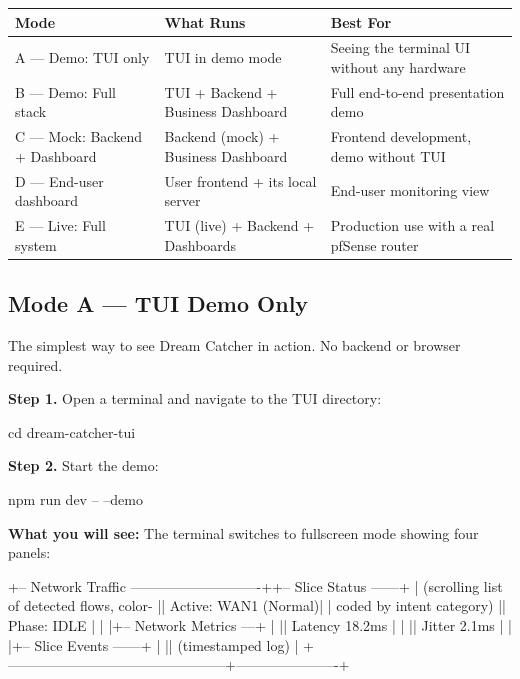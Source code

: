 \documentclass[11pt, a4paper]{article}
\newcommand{\ra}{\rowcolor{tablegray}}
\begin{document}
\vspace{0.3em}
\begin{center}
\renewcommand{\arraystretch}{1.3}
\begin{tabular}{L{3.5cm} L{5cm} L{5.5cm}}
\toprule
{}
\textbf{Mode} & \textbf{What Runs} & \textbf{Best For} \\
\midrule
A — Demo: TUI only
  & TUI in demo mode
  & Seeing the terminal UI without any hardware \\
\ra B — Demo: Full stack
  & TUI + Backend + Business Dashboard
  & Full end-to-end presentation demo \\
C — Mock: Backend + Dashboard
  & Backend (mock) + Business Dashboard
  & Frontend development, demo without TUI \\
\ra D — End-user dashboard
  & User frontend + its local server
  & End-user monitoring view \\
E — Live: Full system
  & TUI (live) + Backend + Dashboards
  & Production use with a real pfSense router \\
\bottomrule
\end{tabular}
\end{center}

\subsection{Mode A — TUI Demo Only}

The simplest way to see Dream Catcher in action. No backend or browser required.

\textbf{Step 1.} Open a terminal and navigate to the TUI directory:

\begin{codebox}[bash]
cd dream-catcher-tui
\end{codebox}

\textbf{Step 2.} Start the demo:

\begin{codebox}[bash]
npm run dev -- --demo
\end{codebox}

\textbf{What you will see:} The terminal switches to fullscreen mode showing four panels:

\begin{verbbox}
+-- Network Traffic ----------------------------++-- Slice Status ------+
| (scrolling list of detected flows, color-     || Active: WAN1 (Normal)|
|  coded by intent category)                    || Phase:  IDLE         |
|                                               |+-- Network Metrics ---+
|                                               || Latency   18.2ms     |
|                                               || Jitter     2.1ms     |
|                                               |+-- Slice Events ------+
|                                               || (timestamped log)    |
+-----------------------------------------------+----------------------+
\end{verbbox}
\end{document}
